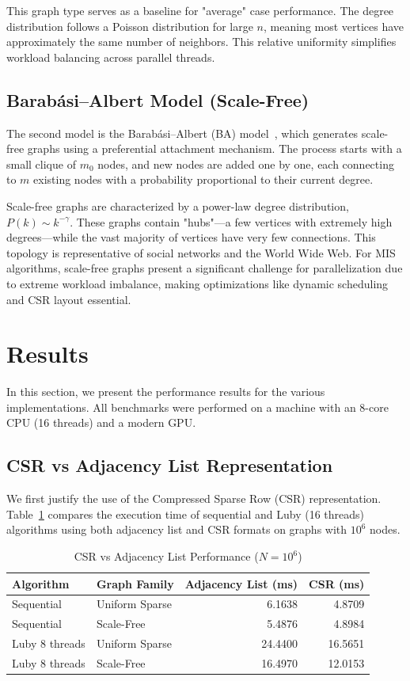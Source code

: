 \documentclass{article}
\begin{document}
This graph type serves as a baseline for "average" case performance. The degree distribution follows a Poisson distribution for large $n$, meaning most vertices have approximately the same number of neighbors. This relative uniformity simplifies workload balancing across parallel threads.

\subsection{Barabási–Albert Model (Scale-Free)}
The second model is the Barabási–Albert (BA) model~\cite{barabasi1999}, which generates scale-free graphs using a preferential attachment mechanism. The process starts with a small clique of $m_0$ nodes, and new nodes are added one by one, each connecting to $m$ existing nodes with a probability proportional to their current degree.

Scale-free graphs are characterized by a power-law degree distribution, $P(k) \sim k^{-\gamma}$. These graphs contain "hubs"—a few vertices with extremely high degrees—while the vast majority of vertices have very few connections. This topology is representative of social networks and the World Wide Web. For MIS algorithms, scale-free graphs present a significant challenge for parallelization due to extreme workload imbalance, making optimizations like dynamic scheduling and CSR layout essential.

\section{Results}

In this section, we present the performance results for the various implementations. All benchmarks were performed on a machine with an 8-core CPU (16 threads) and a modern GPU.

\subsection{CSR vs Adjacency List Representation}
We first justify the use of the Compressed Sparse Row (CSR) representation. Table~\ref{tab:csr_vs_adj} compares the execution time of sequential and Luby (16 threads) algorithms using both adjacency list and CSR formats on graphs with $10^6$ nodes.

\begin{table}[H]
    \centering
    \caption{CSR vs Adjacency List Performance ($N=10^6$)}
    \label{tab:csr_vs_adj}
    \begin{tabular}{l l r r}
        \toprule
        Algorithm & Graph Family & Adjacency List (ms) & CSR (ms) \\
        \midrule
        Sequential & Uniform Sparse & 6.1638 & 4.8709 \\
        Sequential & Scale-Free     & 5.4876 & 4.8984 \\
        Luby 8 threads    & Uniform Sparse & 24.4400 & 16.5651 \\
        Luby 8 threads    & Scale-Free     & 16.4970 & 12.0153 \\
        \bottomrule
    \end{tabular}
\end{table}
\end{document}
